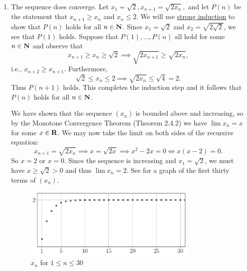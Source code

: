 \documentclass{lew98_solutions}
\begin{document}
\begin{solution}
\begin{enumerate}
        \item The sequence does converge. Let \( x_1 = \sqrt{2}, x_{n+1} = \sqrt{2 x_n}, \) and let \( P(n) \) be the statement that \( x_{n+1} \geq x_n \) and \( x_n \leq 2 \). We will use \href{https://en.wikipedia.org/wiki/Mathematical_induction#Complete_(strong)_induction}{strong induction} to show that \( P(n) \) holds for all \( n \in \mathbf{N} \). Since \( x_1 = \sqrt{2} \) and \( x_2 = \sqrt{2 \sqrt{2}} \), we see that \( P(1) \) holds. Suppose that \( P(1), \ldots, P(n) \) all hold for some \( n \in \mathbf{N} \) and observe that
        \[
            x_{n+1} \geq x_n \geq \sqrt{2} \implies \sqrt{2 x_{n+1}} \geq \sqrt{2 x_n},
        \]
        i.e., \( x_{n+2} \geq x_{n+1} \). Furthermore,
        \[
            \sqrt{2} \leq x_n \leq 2 \implies \sqrt{2 x_n} \leq \sqrt{4} = 2.
        \]
        Thus \( P(n + 1) \) holds. This completes the induction step and it follows that \( P(n) \) holds for all \( n \in \mathbf{N} \).
        
        We have shown that the sequence \( (x_n) \) is bounded above and increasing, so by the Monotone Convergence Theorem (Theorem 2.4.2) we have \( \lim x_n = x \) for some \( x \in \mathbf{R} \). We may now take the limit on both sides of the recursive equation:
        \[
            x_{n+1} = \sqrt{2 x_n} \implies x = \sqrt{2 x} \implies x^2 - 2x = 0 \iff x(x - 2) = 0.
        \]
        So \( x = 2 \) or \( x = 0 \). Since the sequence is increasing and \( x_1 = \sqrt{2} \), we must have \( x \geq \sqrt{2} > 0 \) and thus \( \lim x_n = 2 \). See  for a graph of the first thirty terms of \( (x_n) \).
        \begin{figure}[H]
            \centering
            \includegraphics[width=0.8\textwidth]{UA_Figures/UA_ex2_4_3_fig_2.pdf}
            \caption{\( x_n \) for \( 1 \leq n \leq 30 \)}
            \label{fig:ex2.4.3_2}
        \end{figure}
    \end{enumerate}
\end{solution}
\end{document}
